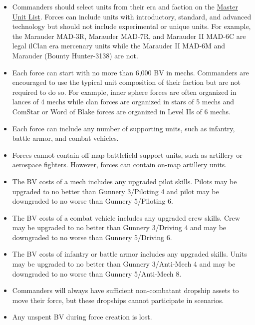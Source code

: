 \documentclass[UTF8]{article}
\begin{document}
\begin{itemize}

\item Commanders should select units from their era and faction on the \href{http://www.masterunitlist.info/}{Master Unit List}.
Forces can include units with introductory, standard, and advanced technology but should not include experimental or unique units.
For example, the Marauder MAD-3R, Marauder MAD-7R, and Marauder II MAD-6C are legal ilClan era mercenary units while the Marauder II MAD-6M and Marauder (Bounty Hunter-3138) are not.

\item Each force can start with no more than 6,000 BV in mechs.
Commanders are encouraged to use the typical unit composition of their faction but are not required to do so.
For example, inner sphere forces are often organized in lances of 4 mechs while clan forces are organized in stars of 5 mechs and ComStar or Word of Blake forces are organized in Level IIs of 6 mechs.

\item Each force can include any number of supporting units, such as infantry, battle armor, and combat vehicles.

\item Forces cannot contain off-map battlefield support units, such as artillery or aerospace fighters.
However, forces can contain on-map artillery units.

\item The BV costs of a mech includes any upgraded pilot skills.
Pilots may be upgraded to no better than Gunnery 3/Piloting 4 and pilot may be downgraded to no worse than Gunnery 5/Piloting 6.

\item The BV costs of a combat vehicle includes any upgraded crew skills.
Crew may be upgraded to no better than Gunnery 3/Driving 4 and may be downgraded to no worse than Gunnery 5/Driving 6.

\item The BV costs of infantry or battle armor includes any upgraded skills.
Units may be upgraded to no better than Gunnery 3/Anti-Mech 4 and may be downgraded to no worse than Gunnery 5/Anti-Mech 8.

\item Commanders will always have sufficient non-combatant dropship assets to move their force, but these dropships cannot participate in scenarios.

\item Any unspent BV during force creation is lost.

\end{itemize}
\end{document}
